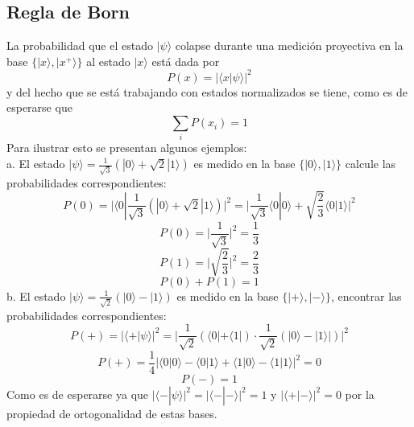 \documentclass[a4paper]{article}
\begin{document}
\subsection{Regla de Born}
La probabilidad que el estado $|\psi\rangle$ colapse durante una medición proyectiva en la base $\{|x\rangle, |x^+ \rangle \}$ al estado $|x\rangle$ está dada por
\begin{equation}
P(x)=|\langle x|\psi\rangle|^2
\end{equation}
y del hecho que se está trabajando con estados normalizados se tiene, como es de esperarse que
\begin{equation}
\sum_i P(x_i)=1
\end{equation}
Para ilustrar esto se presentan algunos ejemplos:\\
a. El estado $|\psi\rangle=\frac{1}{\sqrt{3}}(|0\rangle +\sqrt{2}|1\rangle)$ es medido en la base $\{|0\rangle,   |1\rangle \}$ calcule las probabilidades correspondientes:
\begin{equation*}
P(0)=\bigg |\langle 0|\frac{1}{\sqrt{3}}(|0\rangle +\sqrt{2}|1\rangle)\bigg |^2=\bigg|\frac{1}{\sqrt{3}}\langle 0|0\rangle+\sqrt{\frac{2}{3}}\langle 0|1\rangle \bigg |^2
\end{equation*}
\begin{equation*}
P(0)=\bigg|\frac{1}{\sqrt{3}} \bigg|^2=\frac{1}{3}
\end{equation*}
\begin{equation*}
P(1)=\bigg|\sqrt{\frac{2}{3}} \bigg|^2=\frac{2}{3}
\end{equation*}
\begin{equation*}
P(0)+P(1)=1
\end{equation*}
b. El estado $|\psi\rangle=\frac{1}{\sqrt{2}}(|0\rangle-|1\rangle)$ es medido en la base $\{|+\rangle, |-\rangle\}$, encontrar las probabilidades correspondientes:
\begin{equation*}
P(+)=\bigg| \langle +|\psi\rangle\bigg|^2=\bigg|\frac{1}{\sqrt{2}}(\langle 0| +\langle 1|)\cdot \frac{1}{\sqrt{2}}(|0\rangle -|1\rangle|)\bigg|^2
\end{equation*}
\begin{equation*}
P(+)=\frac{1}{4}\bigg|\langle 0|0\rangle-\langle 0|1\rangle+\langle 1|0\rangle-\langle 1|1\rangle\bigg|^2=0
\end{equation*}
\begin{equation*}
P(-)=1
\end{equation*}
Como es de esperarse ya que $\bigg| \langle -|\psi\rangle\bigg|^2=\bigg| \langle -|-\rangle\bigg|^2=1$ y $\bigg| \langle +|-\rangle\bigg|^2=0$ por la propiedad de ortogonalidad de estas bases.
\end{document}
